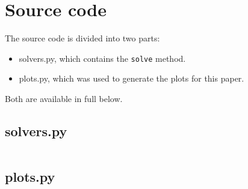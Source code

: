 \documentclass[final]{aomart}
\newcommand{\py}[1]{\texttt{#1}}
\newcommand{\ntt}{\normalfont\ttfamily}
\newcommand{\fn}[1]{{\protect\ntt#1}}
\newtheorem[{}\it]{thm}{Theorem}[section]
\theoremstyle{definition}
\newtheorem*[{}\it]{notation}{Notation}
\numberwithin{equation}{section}
\begin{document}
\section{Source code}
The source code is divided into two parts:
\begin{itemize}
	\item \fn{solvers.py}, which contains the \py{solve} method.
	\item \fn{plots.py}, which was used to generate the plots for this paper.
\end{itemize}
Both are available in full below.

\subsection{\fn{solvers.py}}
\inputminted{Python}{../src/solvers.py}

\subsection{\fn{plots.py}}
\inputminted{Python}{../src/plots.py}
\end{document}
